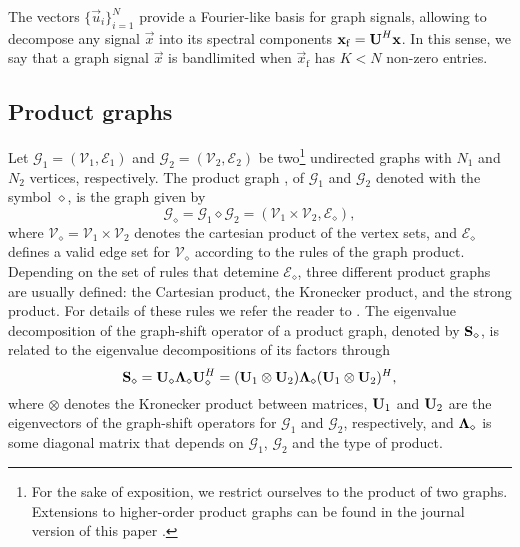 \documentclass{article}
\begin{document}
The vectors $\{\vec{u}_i\}_{i=1}^N$ provide a Fourier-like basis for graph signals, allowing to decompose any signal $\vec{x}$ into its spectral components $\boldsymbol{\mathrm{x}}_\mathrm{f}=\boldsymbol{\mathrm{U}}^H\boldsymbol{\mathrm{x}}$. In this sense, we say that a graph signal $\vec{x}$ is bandlimited \cite{gsp} when $\vec{x}_\mathrm{f}$ has $K<N$ non-zero entries.

\subsection{Product graphs}

Let $\mathcal{G}_1=(\mathcal{V}_1,\mathcal{E}_1)$ and $\mathcal{G}_2=(\mathcal{V}_2,\mathcal{E}_2)$ be two\footnote{For the sake of exposition, we restrict ourselves to the product of two graphs. Extensions to higher-order product graphs can be found in the journal version of this paper \cite{guille}.} undirected graphs with $N_1$ and $N_2$ vertices, respectively. The product graph \cite{graph_theory}, of $\mathcal{G}_1$ and $\mathcal{G}_2$ denoted with the symbol $\diamond$, is the graph given by
\begin{equation*}
	\mathcal{G}_\diamond=\mathcal{G}_1\diamond\mathcal{G}_2=(\mathcal{V}_1\times\mathcal{V}_2,\mathcal{E}_\diamond),
\end{equation*}
where $\mathcal{V}_\diamond=\mathcal{V}_1\times\mathcal{V}_2$ denotes the cartesian product of the vertex sets, and $\mathcal{E}_\diamond$ defines a valid edge set for $\mathcal{V}_\diamond$ according to the rules of the graph product. Depending on the set of rules that detemine $\mathcal{E}_\diamond$, three different product graphs are usually defined: the Cartesian product, the Kronecker product, and the strong product. For details of these rules we refer the reader to \cite{graph_theory}. The eigenvalue decomposition of the graph-shift operator of a product graph, denoted by $\boldsymbol{\mathrm{S}}_\diamond$, is related to the eigenvalue decompositions of its factors through \cite{moura}
\begin{equation*}
	\boldsymbol{\mathrm{S}}_\diamond=\boldsymbol{\mathrm{U}}_\diamond\boldsymbol{\mathrm{\Lambda}}_\diamond\boldsymbol{\mathrm{U}}_\diamond^H=(\boldsymbol{\mathrm{U}}_1\otimes\boldsymbol{\mathrm{U}}_2)\boldsymbol{\mathrm{\Lambda}}_\diamond(\boldsymbol{\mathrm{U}}_1\otimes\boldsymbol{\mathrm{U}}_2)^H,
\end{equation*}
where $\otimes$ denotes the Kronecker product between matrices, $\boldsymbol{\mathrm{U}}_1$ and $\boldsymbol{\mathrm{U}}_2$ are the eigenvectors of the graph-shift operators for $\mathcal{G}_1$ and $\mathcal{G}_2$, respectively, and $\boldsymbol{\mathrm{\Lambda}}_\diamond$ is some diagonal matrix that depends on $\mathcal{G}_1$, $\mathcal{G}_2$ and the type of product.
\end{document}

